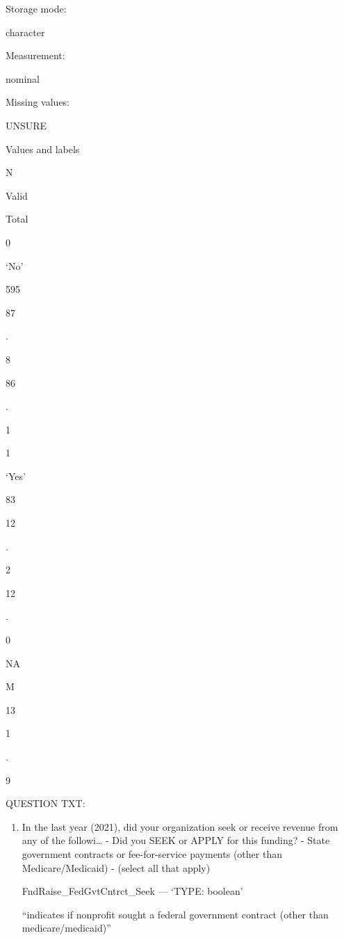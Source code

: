 \documentclass[
  letterpaper,
]{scrbook}
\providecommand{\tightlist}{%
  \setlength{\itemsep}{0pt}\setlength{\parskip}{0pt}}\usepackage{longtable,booktabs,array}
\begin{document}
\begin{enumerate}
\begin{enumerate}
\begin{enumerate}
\begin{enumerate}
        Storage mode:

        character

        Measurement:

        nominal

        Missing values:

        UNSURE

        Values and labels

        N

        Valid

        Total

        0

        `No'

        595

        87

        .

        8

        86

        .

        1

        1

        `Yes'

        83

        12

        .

        2

        12

        .

        0

        NA

        M

        13

        1

        .

        9

        QUESTION TXT:

        \begin{enumerate}
        \def\labelenumv{\arabic{enumv}.}
        \tightlist
        \item
          In the last year (2021), did your organization seek or receive
          revenue from any of the followi\ldots{} - Did you SEEK or
          APPLY for this funding? - State government contracts or
          fee-for-service payments (other than Medicare/Medicaid) -
          (select all that apply)

          FndRaise\_FedGvtCntrct\_Seek --- {`TYPE: boolean'}

          ``indicates if nonprofit sought a federal government contract
          (other than medicare/medicaid)''


\end{enumerate}
\end{enumerate}
\end{enumerate}
\end{enumerate}
\end{enumerate}
\end{document}
